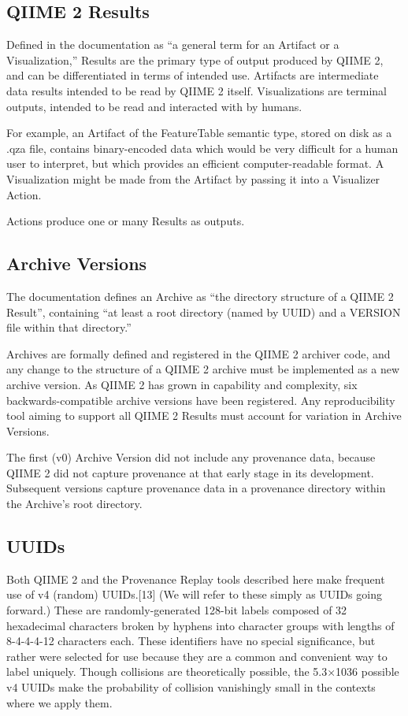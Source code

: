 \subsection{QIIME 2 Results}
Defined in the documentation as “a general term for an Artifact or a
Visualization,” Results are the primary type of output produced by QIIME 2, and
can be differentiated in terms of intended use. Artifacts are intermediate data
results intended to be read by QIIME 2 itself. Visualizations are terminal
outputs, intended to be read and interacted with by humans. 

For example, an Artifact of the FeatureTable semantic type, stored on disk as a
.qza file, contains binary-encoded data which would be very difficult for a
human user to interpret, but which provides an efficient computer-readable
format. A Visualization might be made from the Artifact by passing it into a
Visualizer Action.

Actions produce one or many Results as outputs.

\subsection{Archive Versions}
The documentation defines an Archive as “the directory structure of a QIIME 2
Result”, containing “at least a root directory (named by UUID) and a VERSION
file within that directory.” 

Archives are formally defined and registered in the QIIME 2 archiver code, and
any change to the structure of a QIIME 2 archive must be implemented as a new
archive version. As QIIME 2 has grown in capability and complexity, six
backwards-compatible archive versions have been registered. Any reproducibility
tool aiming to support all QIIME 2 Results must account for variation in Archive
Versions.

The first (v0) Archive Version did not include any provenance data, because
QIIME 2 did not capture provenance at that early stage in its development.
Subsequent versions capture provenance data in a provenance directory within the
Archive’s root directory.

\subsection{UUIDs}
Both QIIME 2 and the Provenance Replay tools described here make frequent use of
v4 (random) UUIDs.[13] (We will refer to these simply as UUIDs going forward.)
These are randomly-generated 128-bit labels composed of 32 hexadecimal
characters broken by hyphens into character groups with lengths of 8-4-4-4-12
characters each. These identifiers have no special significance, but rather were
selected for use because they are a common and convenient way to label uniquely.
Though collisions are theoretically possible, the 5.3×1036 possible v4 UUIDs
make the probability of collision vanishingly small in the contexts where we
apply them.

